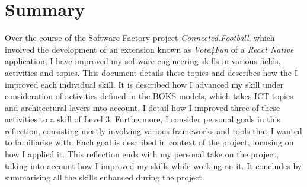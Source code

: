 \section*{Summary}

Over the course of the Software Factory project \textit{Connected.Football}, which involved the development of an extension known as \textit{Vote4Fun} of a \textit{React Native} application, I have improved my software engineering skills in various fields, activities and topics. This document details these topics and describes how the I improved each individual skill.
\newline
It is described how I advanced my skill under consideration of activities defined in the BOKS models, which takes ICT topics and architectural layers into account. I detail how I improved three of these activities to a skill of Level 3.
\newline
Furthermore, I consider personal goals in this reflection, consisting mostly involving various frameworks and tools that I wanted to familiarise with. Each goal is described in context of the project, focusing on how I applied it.
\newline
This reflection ends with my personal take on the project, taking into account how I improved my skills while working on it. It concludes by summarising all the skills enhanced during the project.
